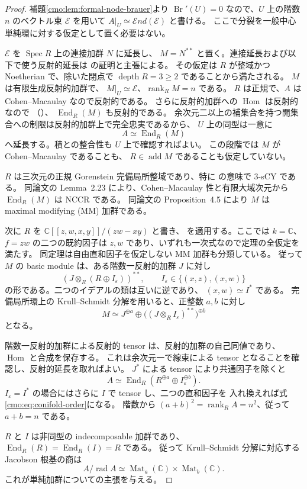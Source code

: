 \begin{proof}
補題\ref{cmo:lem:formal-node-brauer}より
$\operatorname{Br}'(U)=0$ なので、$U$ 上の階数 $n$ のベクトル束
$\mathcal E$ を用いて
$A|_U\simeq\mathcal E nd(\mathcal E)$ と書ける。
ここで分裂を一般中心単純環に対する仮定として置く必要はない。

$\mathcal E$ を $\operatorname{Spec}R$ 上の連接加群 $N$ に延長し、
$M=N^{**}$ と置く。連接延長および以下で使う反射的延長は
\cite[Tag~0EBJ]{CMOStacksNode} の証明と主張による。
その仮定は $R$ が整域かつ Noetherian で、除いた閉点で
$\operatorname{depth}R=3\ge2$ であることから満たされる。
$M$ は有限生成反射的加群で、
$M|_U\simeq\mathcal E$、$\operatorname{rank}_R M=n$ である。
$R$ は正規で、$A$ は Cohen--Macaulay なので反射的である。
さらに反射的加群への $\operatorname{Hom}$ は反射的なので
（\cite[Tag~0AV3]{CMOStacksNode}）、
$\operatorname{End}_R(M)$ も反射的である。
余次元二以上の補集合を持つ開集合への制限は反射的加群上で完全忠実であるから、
$U$ 上の同型は一意に
\[
 A\simeq\operatorname{End}_R(M)
\]
へ延長する。積との整合性も $U$ 上で確認すればよい。
この段階では $M$ が Cohen--Macaulay であることも、
$R\in\operatorname{add}M$ であることも仮定していない。

$R$ は三次元の正規 Gorenstein 完備局所整域であり、特に
\cite{CMOIyamaWemyssMM} の意味で $3$-sCY である。
同論文の Lemma~2.23 により、Cohen--Macaulay 性と有限大域次元から
$\operatorname{End}_R(M)$ は NCCR である。
同論文の Proposition~4.5 により $M$ は maximal modifying (MM) 加群である。

次に $R$ を
$\mathbb C[[z,w,x,y]]/(zw-xy)$ と書き、
\cite[Theorems~5.1(2), 5.20]{CMOIyamaWemyssCA}
を適用する。ここでは $k=\mathbb C$、$f=zw$ の二つの既約因子は
$z,w$ であり、いずれも一次式なので定理の全仮定を満たす。
同定理は自由直和因子を仮定しない MM 加群も分類している。
従って $M$ の basic module は、ある階数一反射的加群 $J$ に対し
\[
 (J\otimes_R(R\oplus I_\varepsilon))^{**},\qquad
 I_\varepsilon\in\{(x,z),(x,w)\}
\]
の形である。二つのイデアルの類は互いに逆であり、
$(x,w)\simeq I^*$ である。
完備局所環上の Krull--Schmidt 分解を用いると、正整数 $a,b$ に対し
\[
 M\simeq J^{\oplus a}\oplus\bigl((J\otimes_R I_\varepsilon)^{**}\bigr)^{\oplus b}
\]
となる。

階数一反射的加群による反射的 tensor は、反射的加群の自己同値であり、
$\operatorname{Hom}$ と合成を保存する。
これは余次元一で線束による tensor となることを確認し、反射的延長を取ればよい。
$J^*$ による tensor により共通因子を除くと
\[
 A\simeq\operatorname{End}_R(R^{\oplus a}\oplus I_\varepsilon^{\oplus b}).
\]
$I_\varepsilon=I^*$ の場合にはさらに $I$ で tensor し、二つの直和因子を
入れ換えれば式\eqref{cmo:eq:conifold-order}になる。
階数から $(a+b)^2=\operatorname{rank}_R A=n^2$、従って $a+b=n$ である。

$R$ と $I$ は非同型の indecomposable 加群であり、
$\operatorname{End}_R(R)=\operatorname{End}_R(I)=R$ である。
従って Krull--Schmidt 分解に対応する Jacobson 根基の商は
\[
 A/\operatorname{rad}A\simeq
 \operatorname{Mat}_a(\mathbb C)\times
 \operatorname{Mat}_b(\mathbb C).
\]
これが単純加群についての主張を与える。
\end{proof}

